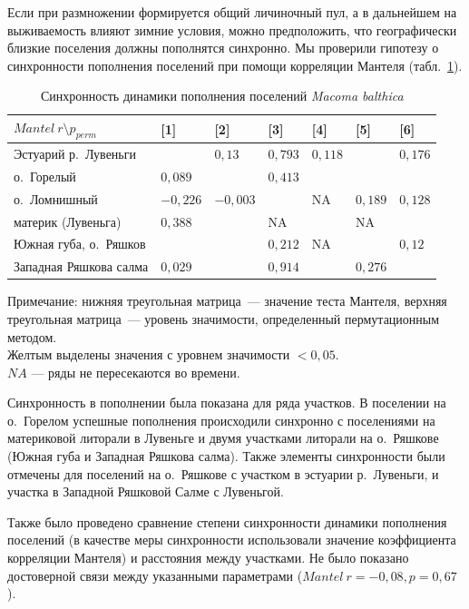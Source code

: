Если при размножении формируется общий личиночный пул, а в дальнейшем на выживаемость влияют зимние условия, можно предположить, что географически близкие поселения должны пополнятся синхронно.
Мы проверили гипотезу о синхронности пополнения поселений при помощи корреляции Мантеля (табл.~\ref{tab:Mantel_dynamic_N1y}).
	\begin{table}[p]
	\caption{Синхронность динамики пополнения поселений {\it Macoma balthica}}
	\label{tab:Mantel_dynamic_N1y}
        \begin{tabularx}{\textwidth}{|p{}|*{6}{X|}} 
	\hline
	$Mantel \ r \setminus p_{perm}$ & [1] & [2] & [3] & [4] & [5] & [6] \\ \hline
	[1] Эстуарий р.~Лувеньги             &         & $0,13$    & $0,793$      & $0,118$   & \cellcolor{yellow}{$0,001$} & $0,176$ \\ \hline
	[2] о.~Горелый             & $0,089$   &         & $0,413$      & \cellcolor{yellow}{$0,009$}   & \cellcolor{yellow}{$0,004$} & \cellcolor{yellow}{$0,001$} \\ \hline
	[3] о.~Ломнишный          & $-0,226$  & $-0,003$  &            & NA      & $0,189$ & $0,128$ \\ \hline
	[4] материк (Лувеньга)             & $0,388$   & \cellcolor{yellow}{$0,955$}   & NA         &         & NA    & \cellcolor{yellow}{$0,02$}  \\ \hline
	[5] Южная губа, о.~Ряшков                 & \cellcolor{yellow}{$0,793$}   & \cellcolor{yellow}{$0,515$}   & $0,212$      & NA      &       & $0,12$  \\ \hline
	[6] Западная Ряшкова салма                 & $0,029$   & \cellcolor{yellow}{$0,986$}   & $0,914$      & \cellcolor{yellow}{$0,965$}   & $0,276$ &       \\ \hline 
	\end{tabularx}
	   {\footnotesize Примечание: нижняя треугольная матрица~--- значение теста Мантеля, верхняя треугольная матрица~--- уровень значимости, определенный пермутационным методом. \\
	Желтым выделены значения с уровнем значимости $< 0,05$. \\
	$NA$ --- ряды не пересекаются во времени.}
	\end{table}
Синхронность в пополнении была показана для ряда участков.
В поселении на о.~Горелом успешные пополнения происходили синхронно с поселениями на материковой литорали в Лувеньге и двумя участками литорали на о.~Ряшкове (Южная губа и Западная Ряшкова салма).
Также элементы синхронности были отмечены для поселений на о.~Ряшкове с участком в эстуарии р.~Лувеньги, и участка в Западной Ряшковой Салме с Лувеньгой.

Также было проведено сравнение степени синхронности динамики пополнения поселений (в качестве меры синхронности использовали значение коэффициента корреляции Мантеля) и расстояния между участками.
Не было показано достоверной связи между указанными параметрами ($Mantel\ r = -0,08, p = 0,67$ ).

